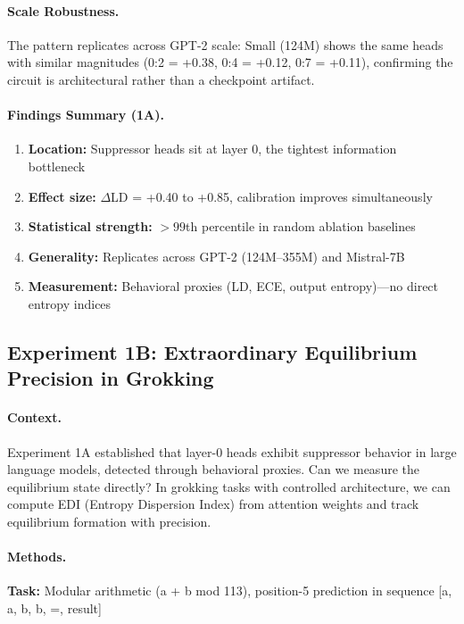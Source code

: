 \paragraph{Scale Robustness.}
The pattern replicates across GPT-2 scale: Small (124M) shows the same heads with similar magnitudes (0:2 = +0.38, 0:4 = +0.12, 0:7 = +0.11), confirming the circuit is architectural rather than a checkpoint artifact.

\paragraph{Findings Summary (1A).}
\begin{enumerate}
\item \textbf{Location:} Suppressor heads sit at layer 0, the tightest information bottleneck
\item \textbf{Effect size:} $\Delta$LD = +0.40 to +0.85, calibration improves simultaneously
\item \textbf{Statistical strength:} $>99$th percentile in random ablation baselines
\item \textbf{Generality:} Replicates across GPT-2 (124M--355M) and Mistral-7B
\item \textbf{Measurement:} Behavioral proxies (LD, ECE, output entropy)—no direct entropy indices
\end{enumerate}

\subsection{Experiment 1B: Extraordinary Equilibrium Precision in Grokking}

\paragraph{Context.}
Experiment 1A established that layer-0 heads exhibit suppressor behavior in large language models, detected through behavioral proxies. Can we measure the equilibrium state directly? In grokking tasks with controlled architecture, we can compute EDI (Entropy Dispersion Index) from attention weights and track equilibrium formation with precision.

\paragraph{Methods.}
\textbf{Task:} Modular arithmetic (a + b mod 113), position-5 prediction in sequence [a, a, b, b, =, result]

